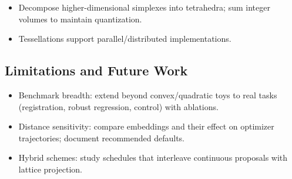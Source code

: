 \documentclass[
  10pt,
]{article}
\providecommand{\tightlist}{%
  \setlength{\itemsep}{0pt}\setlength{\parskip}{0pt}}
\begin{document}
\begin{itemize}
\tightlist
\item
  Decompose higher-dimensional simplexes into tetrahedra; sum integer
  volumes to maintain quantization.
\item
  Tessellations support parallel/distributed implementations.
\end{itemize}

\hypertarget{limitations-and-future-work}{%
\subsection{Limitations and Future
Work}\label{limitations-and-future-work}}

\begin{itemize}
\tightlist
\item
  Benchmark breadth: extend beyond convex/quadratic toys to real tasks
  (registration, robust regression, control) with ablations.
\item
  Distance sensitivity: compare embeddings and their effect on optimizer
  trajectories; document recommended defaults.
\item
  Hybrid schemes: study schedules that interleave continuous proposals
  with lattice projection.
\end{itemize}
\end{document}
